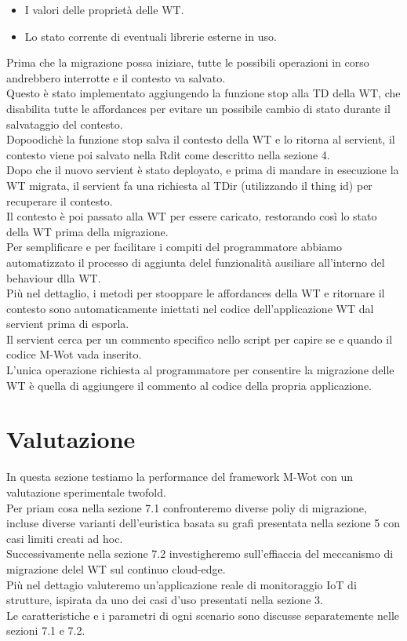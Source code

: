 \documentclass[11pt]{article}
\begin{document}
\begin{enumerate}
\begin{itemize}
			\item I valori delle proprietà delle WT.
			\item Lo stato corrente di eventuali librerie esterne in uso.
		\end{itemize} 
	Prima che la migrazione possa iniziare, tutte le possibili operazioni in corso andrebbero interrotte e il contesto va salvato. \\
	Questo è stato implementato aggiungendo la funzione stop alla TD della WT, che disabilita tutte le affordances per evitare un possibile cambio di stato durante il salvataggio del contesto. \\
	Dopoodichè la funzione stop salva il contesto della WT e lo ritorna al servient, il contesto viene poi salvato nella Rdit come descritto nella sezione 4. \\
	Dopo che il nuovo servient è stato deployato, e prima di mandare in esecuzione la WT migrata, il servient fa una richiesta al TDir (utilizzando il thing id) per recuperare il contesto. \\
	Il contesto è poi passato alla WT per essere caricato, restorando così lo stato della WT prima della migrazione. \\
	Per semplificare e per facilitare i compiti del programmatore abbiamo automatizzato il processo di aggiunta delel funzionalità ausiliare all'interno del behaviour dlla WT. \\
	Più nel dettaglio, i metodi per stooppare le affordances della WT e ritornare il contesto sono automaticamente iniettati nel codice dell'applicazione WT dal servient prima di esporla. \\
	Il servient cerca per un commento specifico nello script per capire se e quando il codice M-Wot vada inserito. \\
	L'unica operazione richiesta al programmatore per consentire la migrazione delle WT è quella di aggiungere il commento al codice della propria applicazione.
	
	\end{enumerate}

	\section{Valutazione}
	In questa sezione testiamo la performance del framework M-Wot con un valutazione sperimentale twofold. \\
	Per priam cosa nella sezione 7.1 confronteremo diverse poliy di migrazione, incluse diverse varianti dell'euristica basata su grafi presentata nella sezione 5 con casi limiti creati ad hoc. \\
	Successivamente nella sezione 7.2 investigheremo sull'effiaccia del meccanismo di migrazione delel WT sul continuo cloud-edge. \\
	Più nel dettagio valuteremo un'applicazione reale di monitoraggio IoT di strutture, ispirata da uno dei casi d'uso presentati nella sezione 3. \\
	Le caratteristiche e i parametri di ogni scenario sono discusse separatemente nelle sezioni 7.1 e 7.2.
\end{document}
